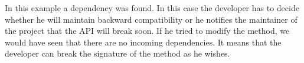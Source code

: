 In this example a dependency was found. In this case the developer 
has to decide whether he will maintain backward compatibility or he notifies the
maintainer of the  project that the API will break soon. If he tried
to modify the  method, we would have seen that there are no incoming
dependencies. It means that the developer can break the signature of the method as
he wishes. 







